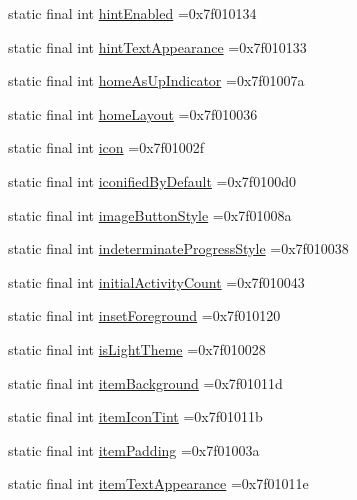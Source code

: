 \begin{DoxyCompactItemize}
static final int \hyperlink{classproject4_1_1xaria_1_1R_1_1attr_a5cf357c624a276e6002292a28873f633}{hint\+Enabled} =0x7f010134
\item 
static final int \hyperlink{classproject4_1_1xaria_1_1R_1_1attr_abf0ca0db0a3e46c1fde4474ba8f124eb}{hint\+Text\+Appearance} =0x7f010133
\item 
static final int \hyperlink{classproject4_1_1xaria_1_1R_1_1attr_a46850cc7c3b0341705d20f3130605f45}{home\+As\+Up\+Indicator} =0x7f01007a
\item 
static final int \hyperlink{classproject4_1_1xaria_1_1R_1_1attr_a96e373568d9179927f31cc06468cd1a4}{home\+Layout} =0x7f010036
\item 
static final int \hyperlink{classproject4_1_1xaria_1_1R_1_1attr_a1a7b0f39b0d5d71310ab388b7e9fc6aa}{icon} =0x7f01002f
\item 
static final int \hyperlink{classproject4_1_1xaria_1_1R_1_1attr_afd23075fa4e8e9cf0cffd07885e4f10b}{iconified\+By\+Default} =0x7f0100d0
\item 
static final int \hyperlink{classproject4_1_1xaria_1_1R_1_1attr_a83227495ab81e78c9d329a52fba6405d}{image\+Button\+Style} =0x7f01008a
\item 
static final int \hyperlink{classproject4_1_1xaria_1_1R_1_1attr_a421e64a7486a5a6c440076cfd07f7686}{indeterminate\+Progress\+Style} =0x7f010038
\item 
static final int \hyperlink{classproject4_1_1xaria_1_1R_1_1attr_a10dc49382cd8712ac6802e84d813da40}{initial\+Activity\+Count} =0x7f010043
\item 
static final int \hyperlink{classproject4_1_1xaria_1_1R_1_1attr_a4cca428de0f7168bef296feabcf26bf2}{inset\+Foreground} =0x7f010120
\item 
static final int \hyperlink{classproject4_1_1xaria_1_1R_1_1attr_a2b02532122bbdba09180807d9434842a}{is\+Light\+Theme} =0x7f010028
\item 
static final int \hyperlink{classproject4_1_1xaria_1_1R_1_1attr_ad4de3651a98e92d9b5bbc3f5aa585e19}{item\+Background} =0x7f01011d
\item 
static final int \hyperlink{classproject4_1_1xaria_1_1R_1_1attr_ae8c0f86007df076e9d9591bc9c8a172b}{item\+Icon\+Tint} =0x7f01011b
\item 
static final int \hyperlink{classproject4_1_1xaria_1_1R_1_1attr_a622773948d03a10f34c229caeed7b5f8}{item\+Padding} =0x7f01003a
\item 
static final int \hyperlink{classproject4_1_1xaria_1_1R_1_1attr_a0ec6e8e1767b6753de3c7040f188d0d5}{item\+Text\+Appearance} =0x7f01011e

\end{DoxyCompactItemize}
